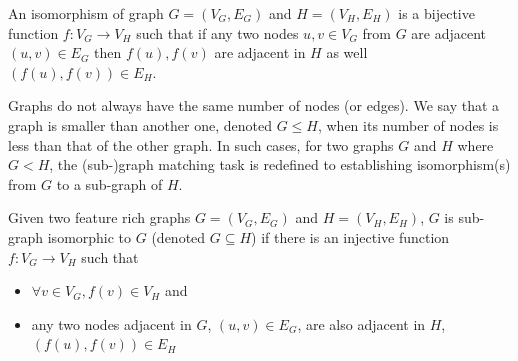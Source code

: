    \begin{definition}\label{def:gisomorphism}
        An isomorphism of graph $G=(V_G,E_G)$ and $H=(V_H,E_H)$ is a bijective function $f:V_G \rightarrow V_H$ such that if any two nodes  $u,v \in V_G$ from $G$ are adjacent $(u,v) \in E_G$ then $f(u), f(v)$ are adjacent in $H$ as well $(f(u), f(v)) \in E_H $.
    \end{definition}

    Graphs do not always have the same number of nodes (or edges). We say that a graph is smaller than another one, denoted $G \leq H$, when its number of nodes is less than that of the other graph. In such cases, for two graphs $G$ and $H$ where $G<H$, the (sub-)graph matching task is redefined to establishing isomorphism(s) from $G$ to a sub-graph of $H$. 

    \begin{definition}\label{def:sgisomorphism}
           Given two feature rich graphs $G=(V_G,E_G)$ and $H=(V_H,E_H)$, $G$ is sub-graph isomorphic to $G$ (denoted $G \subseteq H$) if there is an injective function $f:V_G \rightarrow V_H$ such that
       \begin{itemize}
           \item $\forall v \in V_G, f(v) \in V_H$ and
           \item any two nodes adjacent in $G$, $(u,v) \in E_G$, are also adjacent in $H$, $(f(u), f(v)) \in E_H $
       \end{itemize}
    \end{definition}


